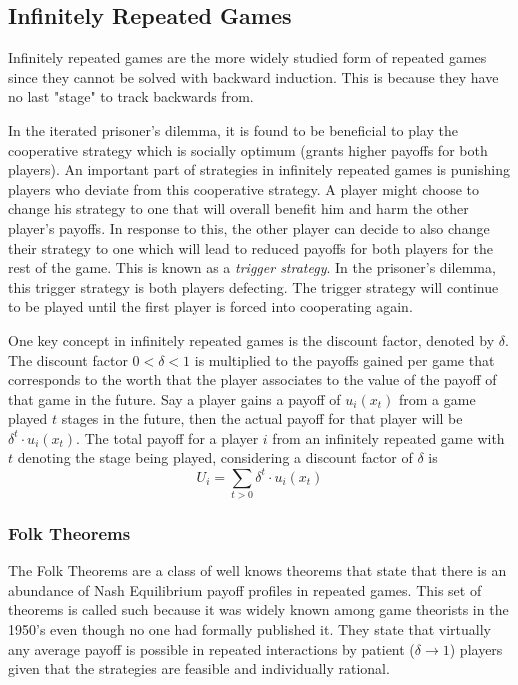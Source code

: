 \documentclass[11pt]{article}
\theoremstyle{definition}
\begin{document}
\subsection{Infinitely Repeated Games}

Infinitely repeated games are the more widely studied form of repeated games since they cannot be solved with backward induction. This is because they have no last "stage" to track backwards from. 

In the iterated prisoner's dilemma, it is found to be beneficial to play the cooperative strategy which is socially optimum (grants higher payoffs for both players). An important part of strategies in infinitely repeated games is punishing players who deviate from this cooperative strategy. A player might choose to change his strategy to one that will overall benefit him and harm the other player's payoffs. In response to this, the other player can decide to also change their strategy to one which will lead to reduced payoffs for both players for the rest of the game. This is known as a \textit{trigger strategy}. In the prisoner's dilemma, this trigger strategy is both players defecting. The trigger strategy will continue to be played until the first player is forced into cooperating again.

One key concept in infinitely repeated games is the discount factor, denoted by $\delta$. The discount factor $0< \delta < 1$ is multiplied to the payoffs gained per game that corresponds to the worth that the player associates to the value of the payoff of that game in the future. Say a player gains a payoff of $u_i(x_t)$ from a game played $t$ stages in the future, then the actual payoff for that player will be $\delta^t{\cdot}u_i(x_t)$. The total payoff for a player $i$ from an infinitely repeated game with $t$ denoting the stage being played, considering a discount factor of $\delta$ is $$U_i = \sum_{t>0}{\delta^t{\cdot}u_i(x_t)}$$ 

\subsubsection*{Folk Theorems}

The Folk Theorems are a class of well knows theorems that state that there is an abundance of Nash Equilibrium payoff profiles in repeated games. This set of theorems is called such because it was widely known among game theorists in the 1950's even though no one had formally published it. They state that virtually any average payoff is possible in repeated interactions by patient ($\delta\rightarrow{1}$) players given that the strategies are feasible and individually rational.
\end{document}
